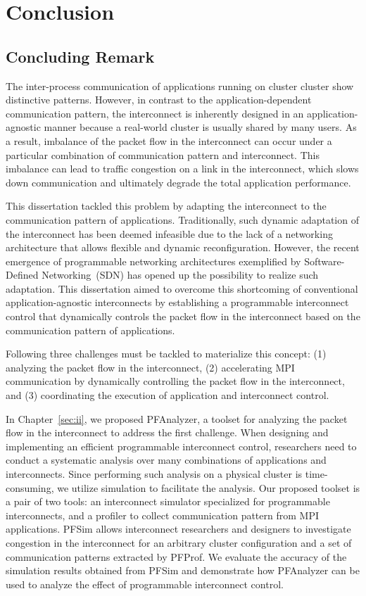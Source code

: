 \chapter{Conclusion}\label{sec:v}

\section{Concluding Remark}

The inter-process communication of applications running on cluster cluster
show distinctive patterns. However, in contrast to the application-dependent
communication pattern, the interconnect is inherently designed in an
application-agnostic manner because a real-world cluster is usually shared by
many users. As a result, imbalance of the packet flow in the interconnect can
occur under a particular combination of communication pattern and
interconnect. This imbalance can lead to traffic congestion on a link in the
interconnect, which slows down communication and ultimately degrade the
total application performance.

This dissertation tackled this problem by adapting the interconnect to the
communication pattern of applications. Traditionally, such dynamic adaptation
of the interconnect has been deemed infeasible due to the lack of a networking
architecture that allows flexible and dynamic reconfiguration. However, the
recent emergence of programmable networking architectures exemplified by
Software-Defined Networking~(SDN) has opened up the possibility to realize
such adaptation. This dissertation aimed to overcome this shortcoming of
conventional application-agnostic interconnects by establishing a programmable
interconnect control that dynamically controls the packet flow in the
interconnect based on the communication pattern of applications.

Following three challenges must be tackled to materialize this concept: (1)
analyzing the packet flow in the interconnect, (2) accelerating MPI
communication by dynamically controlling the packet flow in the interconnect,
and (3) coordinating the execution of application and interconnect control.

In Chapter~\ref{sec:ii},  we proposed PFAnalyzer, a toolset for analyzing the
packet flow in the interconnect to address the first challenge. When designing
and implementing an efficient programmable interconnect control, researchers
need to conduct a systematic analysis over many combinations of applications
and interconnects. Since performing such analysis on a physical cluster is
time-consuming, we utilize simulation to facilitate the analysis. Our proposed
toolset is a pair of two tools: an interconnect simulator specialized for
programmable interconnects, and a profiler to collect communication pattern
from MPI applications. PFSim allows interconnect researchers and designers to
investigate congestion in the interconnect for an arbitrary cluster
configuration and a set of communication patterns extracted by PFProf. We
evaluate the accuracy of the simulation results obtained from PFSim and
demonstrate how PFAnalyzer can be used to analyze the effect of programmable
interconnect control.

